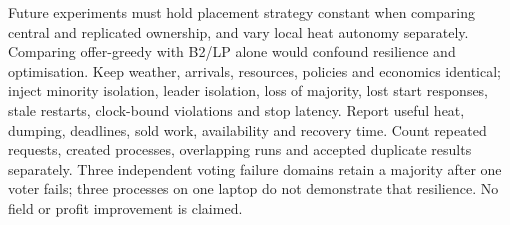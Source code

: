 Future experiments must hold placement strategy constant when comparing central and replicated
ownership, and vary local heat autonomy separately. Comparing offer-greedy with B2/LP alone would
confound resilience and optimisation. Keep weather, arrivals, resources, policies and economics
identical; inject minority isolation, leader isolation, loss of majority, lost start responses,
stale restarts, clock-bound violations and stop latency. Report useful heat, dumping, deadlines,
sold work, availability and recovery time. Count repeated requests, created processes, overlapping
runs and accepted duplicate results separately. Three independent voting failure domains retain a
majority after one voter fails; three processes on one laptop do not demonstrate that resilience.
No field or profit improvement is claimed.

